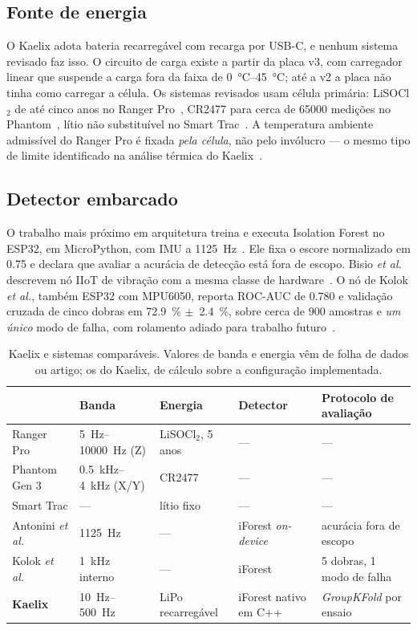 \documentclass[10pt,a4paper,landscape,twocolumn]{article}
\begin{document}
\subsection{Fonte de energia}

O Kaelix adota bateria recarregável com recarga por USB-C, e nenhum sistema revisado faz
isso. O circuito de carga existe a partir da placa v3, com carregador linear que suspende
a carga fora da faixa de \SIrange{0}{45}{\celsius}; até a v2 a placa não tinha como
carregar a célula. Os sistemas revisados usam célula primária: LiSOCl$_2$ de até cinco
anos no Ranger Pro~\cite{bentlynevada2025}, CR2477 para cerca de \num{65000} medições no
Phantom~\cite{erbessd2025}, lítio não substituível no Smart Trac~\cite{tractian2022}. A
temperatura ambiente admissível do Ranger Pro é fixada \emph{pela célula}, não
pelo invólucro --- o mesmo tipo de limite identificado na análise térmica do
Kaelix~\cite{bentlynevada2025}.

\subsection{Detector embarcado}

O trabalho mais próximo em arquitetura treina e executa Isolation Forest no
ESP32, em MicroPython, com IMU a \SI{1125}{\hertz}~\cite{antonini2023}. Ele fixa o escore
normalizado em \num{0,75} e declara que avaliar a acurácia de detecção está fora de
escopo. Bisio \emph{et al.} descrevem nó IIoT de vibração com a mesma classe de
hardware~\cite{bisio2025}. O nó de Kolok \emph{et al.}, também ESP32 com MPU6050, reporta
ROC-AUC de \num{0,780} e validação cruzada de cinco dobras em \SI{72,9}{\percent}
$\pm$~\SI{2,4}{\percent}, sobre cerca de \num{900} amostras e \emph{um único} modo de
falha, com rolamento adiado para trabalho futuro~\cite{kolok2025}.

\begin{table}[!t]
\centering
\caption{Kaelix e sistemas comparáveis. Valores de banda e energia vêm de folha de dados
ou artigo; os do Kaelix, de cálculo sobre a configuração implementada.}
\footnotesize
\begin{tabular}{@{}lllll@{}}
\toprule
 & Banda & Energia & Detector & Protocolo de avaliação \\
\midrule
Ranger Pro & \SIrange{5}{10000}{\hertz} (Z) & LiSOCl$_2$, 5 anos & --- & --- \\
Phantom Gen 3 & \SIrange{0,5}{4}{\kilo\hertz} (X/Y) & CR2477 & --- & --- \\
Smart Trac & --- & lítio fixo & --- & --- \\
Antonini \emph{et al.} & \SI{1125}{\hertz} & --- & iForest \emph{on-device} & acurácia fora de escopo \\
Kolok \emph{et al.} & \SI{1}{\kilo\hertz} interno & --- & iForest & 5 dobras, 1 modo de falha \\
\textbf{Kaelix} & \SIrange{10}{500}{\hertz} & LiPo recarregável & iForest nativo em C++ & \textit{GroupKFold} por ensaio \\
\bottomrule
\end{tabular}
\end{table}
\end{document}
